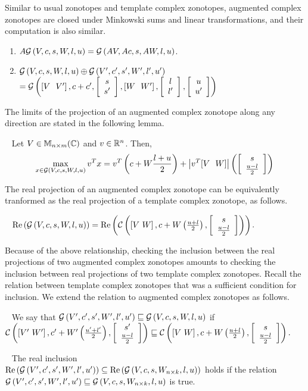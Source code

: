 Similar to usual zonotopes and template complex zonotopes, augmented
complex zonotopes are closed under Minkowski sums and linear
transformations, and their computation is also similar.
%
\begin{lemma}
\begin{enumerate}
\item $A\mathcal{G}\left(V,c,s,W,l,u\right) = \mathcal{G}\left(AV,Ac,s,AW,l,u\right)$.
\item $\mathcal{G}\left(V,c,s,W,l,u\right)\oplus
  \mathcal{G}\left(V^\prime,c^\prime,s^\prime,W^\prime,l^\prime,u^\prime\right)$\\
$= \mathcal{G}\left(\left[V~~V^\prime\right],c+c^\prime,\left[\begin{array}{c}{s}\\{s^\prime} \end{array}\right],\left[W~~W^\prime\right],\left[\begin{array}{c}{l}\\{l^\prime} \end{array}\right],\left[\begin{array}{c}{u}\\{u^\prime} \end{array}\right]\right)$
\end{enumerate}
\end{lemma}
%
The limits of the projection of an augmented complex zonotope along
any direction are stated in the following lemma.
%
\begin{lemma}~\label{lem:polylimits-acz}
Let $V\in\mathbb{M}_{n\times m}(\mathbb{\mathbb{C}})$ and $v\in\mathbb{R}^n$.  Then,
\[
\max_{x\in\mathcal{G}\left(V,c,s,W,l,u\right)}v^Tx = v^T\left(c+W\frac{l+u}{2}\right)+\left|v^T[V~~W]\right|\left(\left[\begin{array}{c}{s}\\{\frac{u-l}{2}} \end{array}\right]\right)
\]
\end{lemma}
%
The real projection of an augmented complex zonotope can be
equivalently tranformed as the real projection of a template complex
zonotope, as follows.
%
\begin{lemma}~\label{lem:conversion}
$\operatorname{\operatorname{Re}}\left(\mathcal{G}\left(V,c,s,W,l,u\right)\right) = \operatorname{\operatorname{Re}}\left(\mathcal{C}\left(\left[V~W\right],c+W\left(\frac{u+l}{2}\right),\left[\begin{array}{c}{s}\\{\frac{u-l}{2}} \end{array}\right]\right)\right)$.
\end{lemma}
%
Because of the above relationship, checking the inclusion between the
real projections of two augmented complex zonotopes amounts to
checking the inclusion between real projections of two template
complex zonotopes.  Recall the relation between template complex
zonotopes that was a sufficient condition for inclusion.  We extend
the relation to augmented complex zonotopes as follows.
%
\begin{definition}~\label{defn:gcz-order}
We say that $\mathcal{G}\left(V^\prime,c^\prime,s^\prime,W^\prime,l^\prime,u^\prime\right)\sqsubseteq
\mathcal{G}\left(V,c,s,W,l,u\right)$ if\\ $\mathcal{C}\left(\left[V^\prime~W^\prime\right],c^\prime+W^\prime\left(\frac{u^\prime+l^\prime}{2}\right),\left[\begin{array}{c}{s^\prime}\\{\frac{u-l}{2}} \end{array}\right]\right)
\sqsubseteq
\mathcal{C}\left(\left[V~W\right],c+W\left(\frac{u+l}{2}\right),\left[\begin{array}{c}{s}\\{\frac{u-l}{2}} \end{array}\right]\right).$
\end{definition}
%
\begin{lemma}~\label{lem:gcz-gcz} The real inclusion\\
$\operatorname{\operatorname{Re}}\left(\mathcal{G}\left(V^\prime,c^\prime,s^\prime,W^\prime,l^\prime,u^\prime\right)\right)\subseteq \operatorname{\operatorname{Re}}\left(\mathcal{G}\left(V,c,s,W_{n\times
k},l,u\right)\right)$ holds if the relation\\
$\mathcal{G}\left(V^\prime,c^\prime,s^\prime,W^\prime,l^\prime,u^\prime\right)\sqsubseteq \mathcal{G}\left(V,c,s,W_{n\times
k},l,u\right)$ is true.
\end{lemma}

